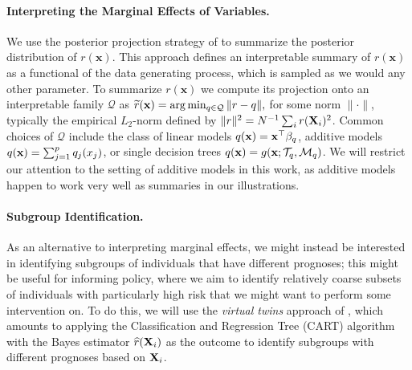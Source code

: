 \documentclass[12pt]{article}
\newcommand{\sM}{\mathcal M}
\newcommand{\sQ}{\mathcal Q}
\newcommand{\Tree}{\mathcal T}
\newcommand{\bx}{\mathbf{x}}
\newcommand{\bfX}{{\bf X}}
\newcommand{\bfx}{{\bf x}}
\begin{document}
\paragraph{Interpreting the Marginal Effects of Variables.}
We use the posterior projection strategy of \citet{woody2020model} to summarize the posterior distribution of $r(\bx)$. This approach defines an interpretable summary of $r(\bx)$ as a functional of the data generating process, which is sampled as we would any other parameter. To summarize $r(\bx)$ we compute its projection onto an interpretable family $\sQ$ as
\begin{math}
    \widetilde r(\bfx) = \arg \min_{q \in \sQ} \|r - q\|,
\end{math}
for some norm $\|\cdot\|$, typically the empirical $L_2$-norm defined by  $\|r\|^2 = N^{-1} \sum_i r(\bfX_i)^2$. Common choices of $\sQ$ include the class  of linear models $q(\bfx) = \bfx^\top \beta_q$, additive models $q(\bfx) = \sum_{j=1}^p  q_j(x_j)$, or single decision trees $q(\bfx) = g(\bfx; \Tree_q, \sM_q)$. We will restrict our attention to the setting of additive models in this work, as additive models happen to work very well as summaries in our illustrations.

\paragraph{Subgroup Identification.}
As an alternative to interpreting marginal effects, we might instead be interested in identifying subgroups of individuals that have different prognoses; this might be useful for informing policy, where we aim to identify relatively coarse subsets of individuals with particularly high risk that we might want to perform some intervention on. To do this, we will use the \emph{virtual twins} approach of \citet{foster2011subgroup}, which amounts to applying the Classification and Regression Tree (CART) algorithm with the Bayes estimator $\widehat r(\bfX_i)$ as the outcome to identify subgroups with different prognoses based on $\bfX_i$.
\end{document}
